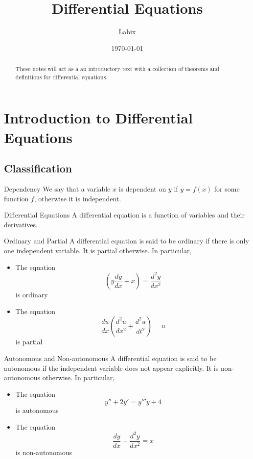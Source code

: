 \documentclass[a4paper]{article}
\title{Differential Equations}
\author{Labix}
\date{\today}
\begin{document}
\maketitle
\begin{abstract}
These notes will act as a an introductory text with a collection of theorems and definitions for differential equations. 
\end{abstract}
\tableofcontents
\pagebreak

\section{Introduction to Differential Equations}
\subsection{Classification}
\begin{defn}{Dependency}{} We say that a variable $x$ is dependent on $y$ if $y=f(x)$ for some function $f$, otherwise it is independent. 
\end{defn}

\begin{defn}{Differential Equations}{} A differential equation is a function of variables and their derivatives. 
\end{defn}

\begin{defn}{Ordinary and Partial}{} A differential equation is said to be ordinary if there is only one independent variable. It is partial otherwise. In particular,
\begin{itemize}
\item The equation $$\left(y\frac{dy}{dx}+x\right)=\frac{d^2y}{dx^2}$$ is ordinary
\item The equation $$\frac{du}{dx}\left(\frac{d^2u}{dx^2}+\frac{d^2u}{dt^2}\right)=u$$ is partial
\end{itemize}
\end{defn}

\begin{defn}{Autonomous and Non-autonomous}{} A differential equation is said to be autonomous if the independent variable does not appear explicitly.  It is non-autonomous otherwise. In particular,
\begin{itemize}
\item The equation $$y''+2y'=y'''y+4$$ is autonomous
\item The equation $$\frac{dy}{dx}+\frac{d^2y}{dx^2}=x$$ is non-autonomous
\end{itemize}
\end{defn}
\end{document}
